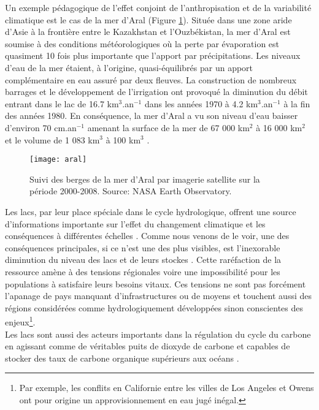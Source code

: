 Un exemple pédagogique de l'effet conjoint de l'anthropisation et de la variabilité climatique est le cas de la mer d'Aral (Figure \ref{aral}).
Située dans une zone aride d'Asie à la frontière entre le Kazakhstan et l'Ouzbékistan, la mer d'Aral est soumise à des conditions météorologiques où la perte par évaporation est quasiment 10 fois plus importante que l'apport par précipitations. Les niveaux d'eau de la mer étaient, à l'origine, quasi-équilibrés par un apport complémentaire en eau assuré par deux fleuves. La construction de nombreux barrages et le développement de l'irrigation ont provoqué la diminution du débit entrant dans le lac de 16.7 km$^{3}$.an$^{-1}$ dans les années 1970 à 4.2 km$^{3}$.an$^{-1}$ à la fin des années 1980. En conséquence, la mer d'Aral a vu son niveau d'eau baisser d'environ 70 cm.an$^{-1}$ amenant la surface de la mer de 67 000 km$^{2}$ à 16 000 km$^{2}$ et le volume de 1 083 km$^{3}$ à 100 km$^3$ \citep{cretaux2005}.\\

\begin{figure}[h!]
 \centerline{\texttt{[image: aral]}}
 \caption{Suivi des berges de la mer d'Aral par imagerie satellite sur la période 2000-2008. Source: NASA Earth Observatory.}
 \label{aral}
\end{figure}
\clearpage
\noindent Les lacs, par leur place spéciale dans le cycle hydrologique, offrent une source d’informations importante sur l’effet du changement climatique et les conséquences à différentes échelles \citep{williamson2009}. Comme nous venons de le voir, une des conséquences principales, si ce n'est une des plus visibles, est l’inexorable diminution du niveau des lacs et de leurs stockes \citep{tao2015,wurtsbaugh2017,wang2018storage,busker2019}. Cette raréfaction de la ressource amène à des tensions régionales voire une impossibilité pour les populations à satisfaire leurs besoins vitaux. Ces tensions ne sont pas forcément l'apanage de pays manquant d'infrastructures ou de moyens et touchent aussi des régions considérées comme hydrologiquement développées sinon conscientes des enjeux\footnote{Par exemple, les conflits en Californie entre les villes de Los Angeles et Owens ont pour origine un approvisionnement en eau jugé inégal.}. \\
\noindent Les lacs sont aussi des acteurs importants dans la régulation du cycle du carbone en agissant comme de véritables puits de dioxyde de carbone et capables de stocker des taux de carbone organique supérieurs aux océans \citep{cole2007}. \\

